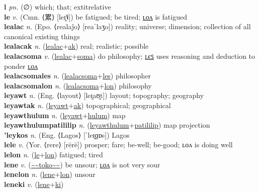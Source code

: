\textbf{l} \textit{pn.} (∅)
which; that; 	extit{relative} \label{l} \\
\textbf{le} \textit{v.} (Cmn. ⟨累⟩ [leɪ̯˥˩])
be fatigued; be tired; \hyperref[lelon]{ʟᴏᴧ} is fatigued \label{le} \\
\textbf{lealac} \textit{n.} (Epo. ⟨realaĵo⟩ [reaˈlaʒo])
reality; universe; dimension; collection of all canonical existing things \label{lealac} \\
\textbf{lealacak} \textit{n.} (\hyperref[lealac]{lealac}+\hyperref[ak]{ak})
real; realistic; possible \label{lealacak} \\
\textbf{lealacsoma} \textit{v.} (\hyperref[lealac]{lealac}+\hyperref[soma]{soma})
do philosophy; \hyperref[lealacsomales]{ʟєꜱ} uses reasoning and deduction to ponder \hyperref[lealacsomalon]{ʟᴏᴧ} \label{lealacsoma} \\
\textbf{lealacsomales} \textit{n.} (\hyperref[lealacsoma]{lealacsoma}+\hyperref[les]{les})
philosopher \label{lealacsomales} \\
\textbf{lealacsomalon} \textit{n.} (\hyperref[lealacsoma]{lealacsoma}+\hyperref[lon]{lon})
philosophy \label{lealacsomalon} \\
\textbf{leyawt} \textit{n.} (Eng. ⟨layout⟩ [leɪ̯aʊ̯t])
layout; topography; geography \label{leyawt} \\
\textbf{leyawtak} \textit{n.} (\hyperref[leyawt]{leyawt}+\hyperref[ak]{ak})
topographical; geographical \label{leyawtak} \\
\textbf{leyawthulum} \textit{n.} (\hyperref[leyawt]{leyawt}+\hyperref[hulum]{hulum})
map \label{leyawthulum} \\
\textbf{leyawthulumpatililip} \textit{n.} (\hyperref[leyawthulum]{leyawthulum}+\hyperref[patililip]{patililip})
map projection \label{leyawthulumpatililip} \\
\textbf{'leykos} \textit{n.} (Eng. ⟨Lagos⟩ [ˈleɪ̯ɡɒs])
Lagos \label{'leykos} \\
\textbf{lele} \textit{v.} (Yor. ⟨rere⟩ [rērē])
prosper; fare; be-well; be-good; ʟᴏᴧ is doing well \label{lele} \\
\textbf{lelon} \textit{n.} (\hyperref[le]{le}+\hyperref[lon]{lon})
fatigued; tired \label{lelon} \\
\textbf{lene} \textit{v.} (\hyperref[toko]{\~{}\~{}toko\~{}\~{}})
be unsour; \hyperref[lenelon]{ʟᴏᴧ} is not very sour \label{lene} \\
\textbf{lenelon} \textit{n.} (\hyperref[lene]{lene}+\hyperref[lon]{lon})
unsour \label{lenelon} \\
\textbf{leneki} \textit{v.} (\hyperref[lene]{lene}+\hyperref[ki]{ki})
